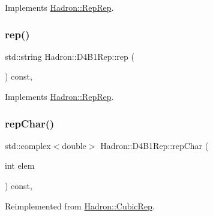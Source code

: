 Implements \mbox{\hyperlink{structHadron_1_1RepRep_ab3213025f6de249f7095892109575fde}{Hadron\+::\+Rep\+Rep}}.

\mbox{\label{structHadron_1_1D4B1Rep_a516f90b12897aaf51c240310d9183687}} 
\subsubsection{\texorpdfstring{rep()}{rep()}\hspace{0.1cm}{\footnotesize\ttfamily [3/3]}}
{\footnotesize\ttfamily std\+::string Hadron\+::\+D4\+B1\+Rep\+::rep (\begin{DoxyParamCaption}{ }\end{DoxyParamCaption}) const\hspace{0.3cm}{\ttfamily [inline]}, {\ttfamily [virtual]}}



Implements \mbox{\hyperlink{structHadron_1_1RepRep_ab3213025f6de249f7095892109575fde}{Hadron\+::\+Rep\+Rep}}.

\mbox{\label{structHadron_1_1D4B1Rep_ae49fe8e7bfc46c213d32d7c0d99236f1}} 
\subsubsection{\texorpdfstring{repChar()}{repChar()}\hspace{0.1cm}{\footnotesize\ttfamily [1/2]}}
{\footnotesize\ttfamily std\+::complex$<$double$>$ Hadron\+::\+D4\+B1\+Rep\+::rep\+Char (\begin{DoxyParamCaption}\item[{int}]{elem }\end{DoxyParamCaption}) const\hspace{0.3cm}{\ttfamily [inline]}, {\ttfamily [virtual]}}



Reimplemented from \mbox{\hyperlink{structHadron_1_1CubicRep_af45227106e8e715e84b0af69cd3b36f8}{Hadron\+::\+Cubic\+Rep}}.

